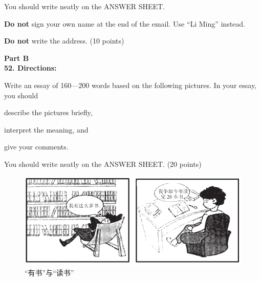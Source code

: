 You should write neatly on the ANSWER SHEET.

\textbf{Do not} sign your own name at the end of the email. Use ``Li
Ming'' instead.

\textbf{Do not} write the address. (10 points)

\vspace{2em}

\noindent
\textbf{Part B}\\
\textbf{52. Directions:}

Write an essay of 160---200 words based on the following pictures. In
your essay, you should
\begin{listwrite}
	\item
describe the pictures briefly,

\item 
 interpret the meaning, and

\item 
 give your comments.
\end{listwrite}

You should write neatly on the ANSWER SHEET. (20 points)


\begin{figure}[h!]
	\centering
	\includegraphics[width=0.87\linewidth]{picture/2017.png}
	\caption*{“有书”与“读书”}
\end{figure}



\checkpagenumber